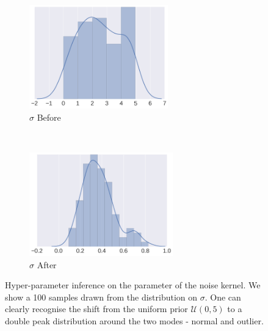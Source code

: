 \documentclass{article} %
\begin{document}
\begin{figure}
        \centering
        \begin{subfigure}[b]{0.5\textwidth} \centering
                \includegraphics[height=4.5cm]{figs/neal_unif_sigma_before_desktop_50_5.png}
                \caption{$\sigma$ Before}
                \label{fig:before}
        \end{subfigure}%
        ~ %
        \begin{subfigure}[b]{0.5\textwidth} \centering
                \includegraphics[height=4.5cm]{figs/neal_unif_sigma_after_ulliDesktop_n503.png}
                \caption{$\sigma$  After}
                \label{fig:after))}
        \end{subfigure}
        \caption{Hyper-parameter inference on the parameter of the noise kernel. We show a 100 samples drawn from the distribution on $\sigma$. One can clearly recognise the shift from the uniform prior $\mathcal{U}(0,5)$ to a double peak distribution around the two modes - normal and outlier.}\label{fig:inference}
\end{figure}
\end{document}
